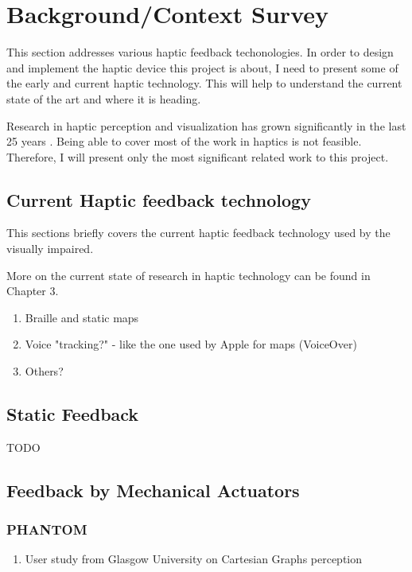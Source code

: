 \chapter{Background/Context Survey}

This section addresses various haptic feedback techonologies. In order to design and implement the haptic device this project is about, I need to present some of the early and current haptic technology. This will help to understand the current state of the art and where it is heading.

Research in haptic perception and visualization has grown significantly in the last 25 years \cite{roberts2007we}. Being able to cover most of the work in haptics is not feasible. Therefore, I will present only the most significant related work to this project. 

\section{Current Haptic feedback technology}
This sections briefly covers the current haptic feedback technology used by the visually impaired.

More on the current state of research in haptic technology can be found in Chapter 3. 

    \begin{enumerate}
    	\item Braille and static maps
        \item Voice "tracking?" - like the one used by Apple for maps (VoiceOver)
        \item Others? 
    \end{enumerate}
    
\section{Static Feedback}

TODO

\section{Feedback by Mechanical Actuators}
\subsection{PHANTOM}

\begin{enumerate}
	\item User study from Glasgow University on Cartesian Graphs perception
\end{enumerate}

